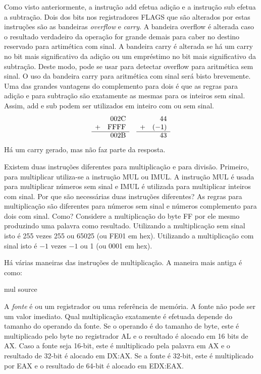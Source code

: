 Como visto anteriormente, a instrução {\code add} efetua adição e
a instrução {\code sub} efetua a subtração. Dois dos bits nos
registradores FLAGS que são alterados por estas instruções são as bandeiras \emph{overflow}
e \emph{carry}. A bandeira overflow é alterada caso o resultado verdadeiro da
operação for grande demais para caber no destino reservado para artimética 
com sinal. A bandeira carry é alterada se há um carry no bit mais significativo da
adição ou um empréstimo no bit mais significativo da subtração. Deste modo, pode se usar
para detectar overflow para aritmética sem sinal. O uso da bandeira carry 
para aritmética com sinal será bisto brevemente. Uma das grandes vantagens
do complemento para dois é que as regras para adição e 
para subtração são exatamente as mesmas para os inteiros sem sinal. Assim,
{\code add} e {\code sub} podem ser utilizados em inteiro com ou sem 
sinal.
\[
\begin{array}{rrcrr}
 & 002\mathrm{C} & & & 44\\
+& \mathrm{FFFF} & &+&(-1)\\ \cline{1-2} \cline{4-5}
 & 002\mathrm{B} & & & 43
\end{array}
\]
Há um carry gerado, mas não faz parte da resposta.

Existem duas instruções diferentes para multiplicação e para divisão. Primeiro, para
multiplicar utiliza-se a instrução {\code MUL} ou {\code IMUL}. A
instrução {\code MUL} é usada para multiplicar números sem sinal e
{\code IMUL} é utilizada para multiplicar inteiros com sinal. Por que são
necessárias duas instruções diferentes? As regras para multiplicação são
diferentes para números sem sinal e números complemento para dois com sinal. Como?
Considere a multiplicação do byte FF por ele mesmo produzindo uma palavra
como resultado. Utilizando a multiplicação sem sinal isto é 255 vezes 255 ou 65025
(ou FE01 em hex). Utilizando a multiplicação com sinal isto é $-1$ vezes $-1$ ou
1 (ou 0001 em hex).

Há várias maneiras das instruções de multiplicação. A maneira mais 
antiga é como:
\begin{AsmCodeListing}[numbers=none,frame=none]
      mul   source
\end{AsmCodeListing}
A \emph{fonte} é ou um registrador ou uma referência de memória. A fonte não pode ser  
um valor imediato. Qual multiplicação exatamente é efetuada depende do
tamanho do operando da fonte. Se o operando é do tamanho de byte, este é multiplicado pelo
byte no registrador AL e o resultado é alocado em 16 bits de AX.
Caso a fonte seja 16-bit, este é multiplicado pela palavra em AX e o resultado de 32-bit
é alocado em DX:AX. Se a fonte é 32-bit, este é multiplicado por EAX
e o resultado de 64-bit é alocado em EDX:EAX.

